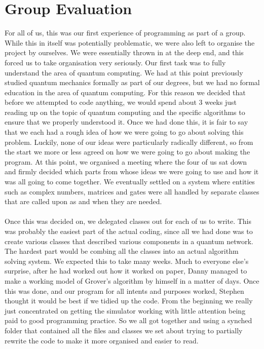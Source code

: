 \documentclass[12pt]{report}
\begin{document}
\chapter{Group Evaluation}
For all of us, this was our first experience of programming as part of a group. While this in itself was potentially problematic, we were also left to organise the project by ourselves.  We were essentially thrown in at the deep end, and this forced us to take organisation very seriously.
Our first task was to fully understand the area of quantum computing. We had at this point previously studied quantum mechanics formally as part of our degrees, but we had no formal education in the area of quantum computing. For this reason we decided that before we attempted to code anything, we would spend about 3 weeks just reading up on the topic of quantum computing and the specific algorithms to ensure that we properly understood it. Once we had done this, it is fair to say that we each had a rough idea of how we were going to go about solving this problem.
Luckily, none of our ideas were particularly radically different, so from the start we more or less agreed on how we were going to go about making the program.
At this point, we organised a meeting where the four of us sat down and firmly decided which parts from whose ideas we were going to use and how it was all going to come together. We eventually settled on a system where entities such as complex numbers, matrices and gates were all handled by separate classes that are called upon as and when they are needed. \\ \\
Once this was decided on, we delegated classes out for each of us to write. This was probably the easiest part of the actual coding, since all we had done was to create various classes that described various components in a quantum network. The hardest part would be combing all the classes into an actual algorithm solving system. We expected this to take many weeks.
Much to everyone else’s surprise, after he had worked out how it worked on paper, Danny managed to make a working model of Grover's algorithm by himself in a matter of days.
Once this was done, and our program for all intents and purposes worked, Stephen thought it would be best if we tidied up the code. From the beginning we really just concentrated on getting the simulator working with little attention being paid to good programming practice. So we all got together and using a synched folder that contained all the files and classes we set about trying to partially rewrite the code to make it more organised and easier to read.
\end{document}
